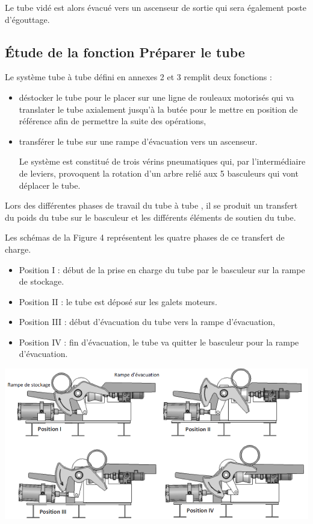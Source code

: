 Le tube vidé est alors évacué vers un ascenseur de sortie qui sera également poste d'égouttage.

\subsection{Étude de la fonction \og Préparer le tube \fg}

Le système \og tube à tube \fg défini en annexes 2 et 3 remplit deux fonctions :
\begin{itemize}
 \item déstocker le tube pour le placer sur une ligne de rouleaux motorisés qui va translater le tube axialement jusqu'à la butée pour le mettre en position de référence afin de permettre la suite des opérations,
 \item transférer le tube sur une rampe d'évacuation vers un ascenseur.
 
Le système est constitué de trois vérins pneumatiques qui, par l'intermédiaire de leviers, provoquent la rotation d'un arbre relié aux 5 basculeurs qui vont déplacer le tube.
\end{itemize}

Lors des différentes phases de travail du \og tube à tube \fg, il se produit un transfert du poids du tube sur le basculeur et les différents éléments de soutien du tube.

Les schémas de la Figure 4 représentent les quatre phases de ce transfert de charge.
\begin{itemize}
 \item Position I : début de la prise en charge du tube par le basculeur sur la rampe de stockage.
 \item Position II : le tube est déposé sur les galets moteurs.
 \item Position III : début d'évacuation du tube vers la rampe d'évacuation,
 \item Position IV : fin d'évacuation, le tube va quitter le basculeur pour la rampe d'évacuation.
\end{itemize} 

\begin{center}
	\includegraphics[width=0.9\linewidth]{img/Banc_fig02}
\end{center}

